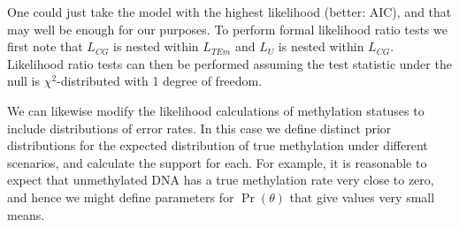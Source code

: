 \documentclass[12pt,longbibliography]{article}
\begin{document}
One could just take the model with the highest likelihood (better: AIC), and that may well be enough for our purposes. To perform formal likelihood ratio tests we first note that $L_{CG}$ is nested within $L_{TEm}$ and $L_{U}$ is nested within $L_{CG}$. Likelihood ratio tests can then be performed assuming the test statistic under the null is $\chi^2$-distributed 
with 1 degree of freedom.



We can likewise modify the likelihood calculations of methylation statuses to include distributions of error rates.
In this case we define distinct prior distributions for the expected distribution of true methylation under different scenarios, and calculate the support for each.
For example, it is reasonable to expect that unmethylated DNA has a true methylation rate very close to zero, and hence we might define parameters for $\Pr(\theta)$ that give values very small means.

\printbibliography %
\end{document}
